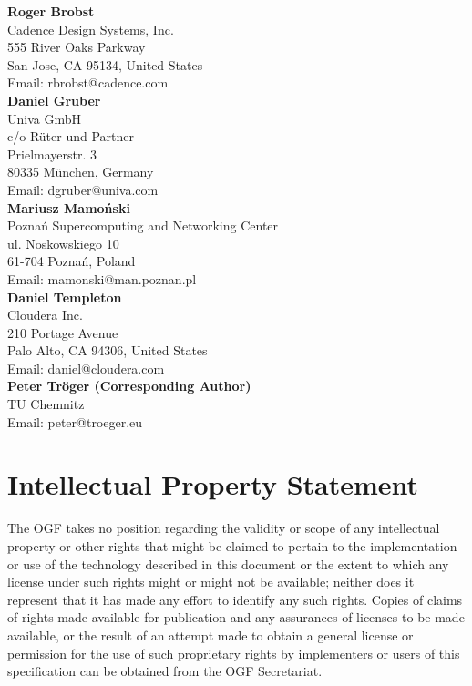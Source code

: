 \documentclass{article}
\begin{document}
\begin{samepage}
\textbf{Roger Brobst}\\
Cadence Design Systems, Inc.\\
555 River Oaks Parkway \\
San Jose, CA 95134, United States\\
Email: rbrobst@cadence.com\\

\textbf{Daniel Gruber}\\
Univa GmbH\\
c/o Rüter und Partner\\
Prielmayerstr. 3\\
80335 München, Germany\\
Email: dgruber@univa.com\\

\textbf{Mariusz Mamoński}\\
Poznań Supercomputing and Networking Center\\
ul. Noskowskiego 10\\
61-704 Poznań, Poland\\
Email: mamonski@man.poznan.pl\\

\textbf{Daniel Templeton} \\
Cloudera Inc.\\
210 Portage Avenue\\
Palo Alto, CA 94306, United States\\
Email: daniel@cloudera.com\\

\textbf{Peter Tröger (Corresponding Author)} \\
TU Chemnitz\\
Email: peter@troeger.eu \\
\end{samepage}



\section{Intellectual Property Statement}

 The OGF takes no position regarding the validity or scope of any
 intellectual property or other rights that might be claimed to
 pertain to the implementation or use of the technology described in
 this document or the extent to which any license under such rights
 might or might not be available; neither does it represent that it
 has made any effort to identify any such rights.  Copies of claims of
 rights made available for publication and any assurances of licenses
 to be made available, or the result of an attempt made to obtain a
 general license or permission for the use of such proprietary rights
 by implementers or users of this specification can be obtained from
 the OGF Secretariat.
\end{document}

